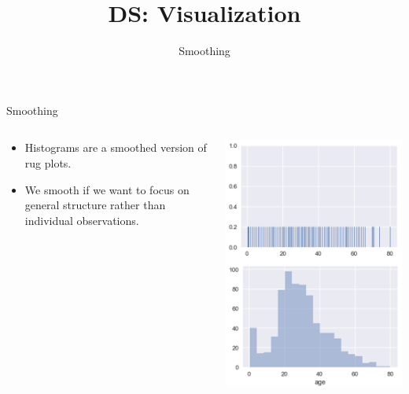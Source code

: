 \documentclass[aspectratio=169]{../latex_main/tntbeamer}  %
\title[Visualization]{DS: Visualization}
\subtitle{Smoothing}
\begin{document}
	
	\maketitle
	\begin{frame}{Smoothing}
	    \begin{columns}
	        \begin{column}{.6\textwidth}
	               \begin{itemize}
	                   \item Histograms are a smoothed version of rug plots.
	                   \item We smooth if we want to focus on general structure rather than individual observations.
	               \end{itemize} 
	        \end{column}
	        
	        
	        \begin{column}{.5\textwidth}

	                    \centering
	                    \includegraphics[scale=.32]{Bild82}

	        \end{column}
	    \end{columns}
	\end{frame}
	
\end{document}
